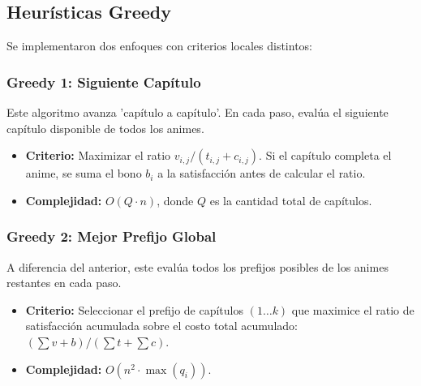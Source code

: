 \subsection{Heurísticas Greedy}
Se implementaron dos enfoques con criterios locales distintos:

\subsubsection{Greedy 1: Siguiente Capítulo}
Este algoritmo avanza 'capítulo a capítulo'. En cada paso, evalúa el siguiente capítulo disponible de todos los animes.
\begin{itemize}
    \item \textbf{Criterio:} Maximizar el ratio $v_{i,j} / (t_{i,j} + c_{i,j})$. Si el capítulo completa el anime, se suma el bono $b_i$ a la satisfacción antes de calcular el ratio.
    \item \textbf{Complejidad:} $O(Q \cdot n)$, donde $Q$ es la cantidad total de capítulos.
\end{itemize}

\subsubsection{Greedy 2: Mejor Prefijo Global}
A diferencia del anterior, este evalúa todos los prefijos posibles de los animes restantes en cada paso.
\begin{itemize}
    \item \textbf{Criterio:} Seleccionar el prefijo de capítulos $(1 \dots k)$ que maximice el ratio de satisfacción acumulada sobre el costo total acumulado: $(\sum v + b) / (\sum t + \sum c)$.
    \item \textbf{Complejidad:} $O(n^2 \cdot \max(q_i))$.
\end{itemize}
